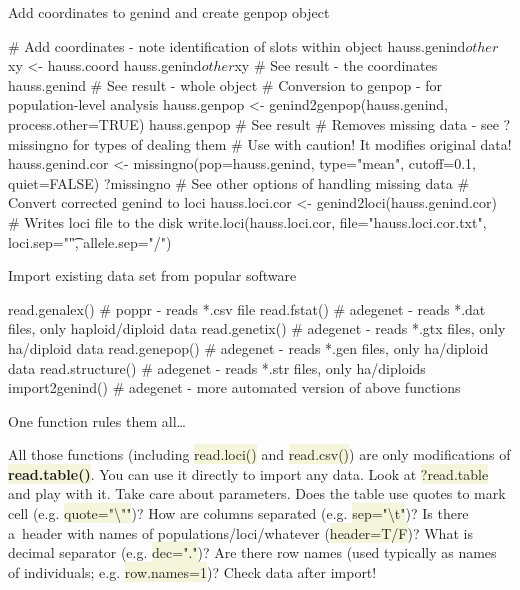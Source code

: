 \documentclass[compress, ucs, xelatex, 11pt, xcolor=svgnames, aspectratio=169,
	hyperref={
		bookmarks=true,
		unicode=true,
		colorlinks=true,
		pdftitle={Molecular data in R},
		plainpages=false,
		pdfauthor={Vojtech Zeisek},
		pdfsubject={Course about phylogeny and evolution in R},
		pdfcreator={XeLaTeX},
		pdfkeywords={R, evolution, phylogeny, molecular data},
		linkcolor=Crimson, %
		anchorcolor=Magenta, %
		citecolor=Magenta, %
		filecolor=Magenta, %
		menucolor=Magenta, %
		urlcolor=DodgerBlue, %
		pdftex},
	url={hyphens, lowtilde} %
	]{beamer}
\renewcommand{\texttt}[1]{\colorbox{Beige}{{\ttfamily #1}}}
\begin{document}
\begin{frame}[fragile]{Add coordinates to genind and create genpop object}
	\begin{spluscode}
    # Add coordinates - note identification of slots within object
    hauss.genind$other$xy <- hauss.coord
    hauss.genind$other$xy # See result - the coordinates
    hauss.genind # See result - whole object
    # Conversion to genpop - for population-level analysis
    hauss.genpop <- genind2genpop(hauss.genind, process.other=TRUE)
    hauss.genpop # See result
    # Removes missing data - see ?missingno for types of dealing them
    # Use with caution! It modifies original data!
    hauss.genind.cor <- missingno(pop=hauss.genind, type="mean", cutoff=0.1,
      quiet=FALSE)
    ?missingno # See other options of handling missing data
    # Convert corrected genind to loci
    hauss.loci.cor <- genind2loci(hauss.genind.cor)
    # Writes loci file to the disk
    write.loci(hauss.loci.cor, file="hauss.loci.cor.txt", loci.sep="\t",
      allele.sep="/")
	\end{spluscode}
\end{frame}

\begin{frame}[fragile]{Import existing data set from popular software}
	\begin{spluscode}
    read.genalex() # poppr - reads *.csv file
    read.fstat() # adegenet - reads *.dat files, only haploid/diploid data
    read.genetix() # adegenet - reads *.gtx files, only ha/diploid data
    read.genepop() # adegenet - reads *.gen files, only ha/diploid data
    read.structure() # adegenet - reads *.str files, only ha/diploids
    import2genind() # adegenet - more automated version of above functions
	\end{spluscode}
	\begin{alertblock}{One function rules them all\ldots}
		\begin{footnotesize}
			All those functions (including \texttt{read.loci()} and \texttt{read.csv()}) are only modifications of \textbf{\texttt{read.table()}}. You can use it directly to import any data. Look at \texttt{?read.table} and play with it. Take care about parameters. Does the table use quotes to mark cell (e.g. \texttt{quote="\textbackslash ""})? How are columns separated (e.g. \texttt{sep="\textbackslash t"})? Is there a~header with names of populations/loci/whatever (\texttt{header=T/F})? What is decimal separator (e.g. \texttt{dec="."})? Are there row names (used typically as names of individuals; e.g. \texttt{row.names=1})? \alert{Check data after import!}
		\end{footnotesize}
	\end{alertblock}
\end{frame}
\end{document}
